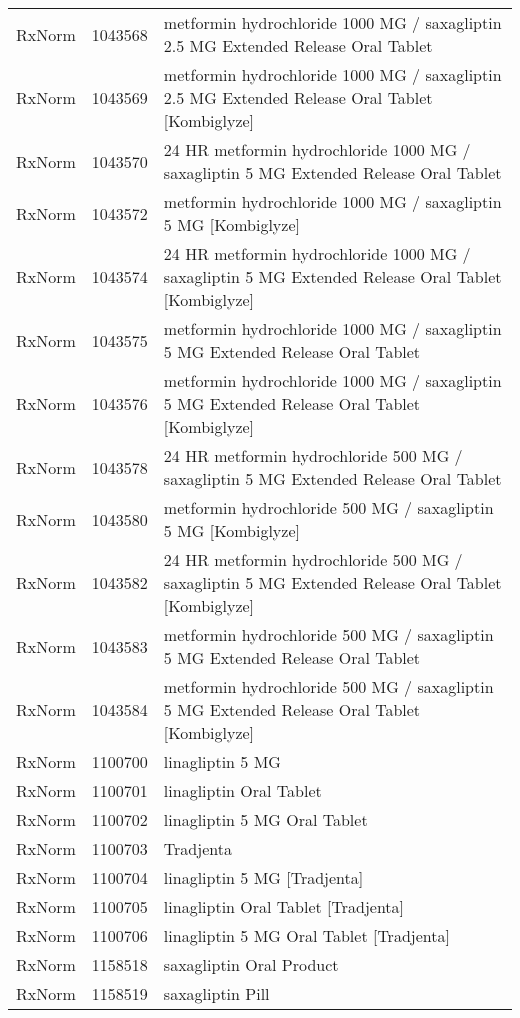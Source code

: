 \begin{longtable}{p{}p{}p{}}
  RxNorm & 1043568 & metformin hydrochloride 1000 MG / saxagliptin 2.5 MG Extended Release Oral Tablet \\ 
  RxNorm & 1043569 & metformin hydrochloride 1000 MG / saxagliptin 2.5 MG Extended Release Oral Tablet [Kombiglyze] \\ 
  RxNorm & 1043570 & 24 HR metformin hydrochloride 1000 MG / saxagliptin 5 MG Extended Release Oral Tablet \\ 
  RxNorm & 1043572 & metformin hydrochloride 1000 MG / saxagliptin 5 MG [Kombiglyze] \\ 
  RxNorm & 1043574 & 24 HR metformin hydrochloride 1000 MG / saxagliptin 5 MG Extended Release Oral Tablet [Kombiglyze] \\ 
  RxNorm & 1043575 & metformin hydrochloride 1000 MG / saxagliptin 5 MG Extended Release Oral Tablet \\ 
  RxNorm & 1043576 & metformin hydrochloride 1000 MG / saxagliptin 5 MG Extended Release Oral Tablet [Kombiglyze] \\ 
  RxNorm & 1043578 & 24 HR metformin hydrochloride 500 MG / saxagliptin 5 MG Extended Release Oral Tablet \\ 
  RxNorm & 1043580 & metformin hydrochloride 500 MG / saxagliptin 5 MG [Kombiglyze] \\ 
  RxNorm & 1043582 & 24 HR metformin hydrochloride 500 MG / saxagliptin 5 MG Extended Release Oral Tablet [Kombiglyze] \\ 
  RxNorm & 1043583 & metformin hydrochloride 500 MG / saxagliptin 5 MG Extended Release Oral Tablet \\ 
  RxNorm & 1043584 & metformin hydrochloride 500 MG / saxagliptin 5 MG Extended Release Oral Tablet [Kombiglyze] \\ 
  RxNorm & 1100700 & linagliptin 5 MG \\ 
  RxNorm & 1100701 & linagliptin Oral Tablet \\ 
  RxNorm & 1100702 & linagliptin 5 MG Oral Tablet \\ 
  RxNorm & 1100703 & Tradjenta \\ 
  RxNorm & 1100704 & linagliptin 5 MG [Tradjenta] \\ 
  RxNorm & 1100705 & linagliptin Oral Tablet [Tradjenta] \\ 
  RxNorm & 1100706 & linagliptin 5 MG Oral Tablet [Tradjenta] \\ 
  RxNorm & 1158518 & saxagliptin Oral Product \\ 
  RxNorm & 1158519 & saxagliptin Pill \\ 

\end{longtable}
